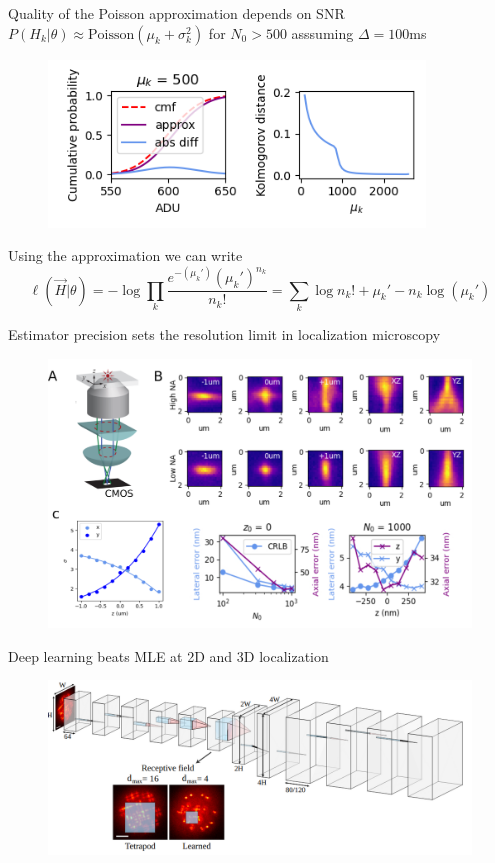 \documentclass{beamer}					%
\begin{document}
\begin{frame}{Quality of the Poisson approximation depends on SNR}
$P(H_{k}|\theta)\approx \mathrm{Poisson}(\mu_{k}+\sigma_{k}^{2})$ for $N_{0} > 500$ asssuming $\Delta=100$ms 
\begin{figure}
\includegraphics[width=10cm]{Kolmogorov.png}
\end{figure}
Using the approximation we can write
\begin{equation*}
\ell(\vec{H}|\theta) = -\log \prod_{k} \frac{e^{-\left(\mu_{k}'\right)}\left(\mu_{k}'\right)^{n_{k}}}{n_{k}!} = \sum_{k}  \log n_{k}! + \mu_{k}' - n_{k}\log\left(\mu_{k}'\right)
\end{equation*}

\end{frame}


\begin{frame}{Estimator precision sets the resolution limit in localization microscopy}
\begin{figure}
\includegraphics[width=13cm]{Astigmatism.png}
\end{figure}
\end{frame}

\begin{frame}{Deep learning beats MLE at 2D and 3D localization}
\begin{figure}
\includegraphics[width=13cm]{Architecture.png}
\end{figure}
\end{frame}
\end{document}
